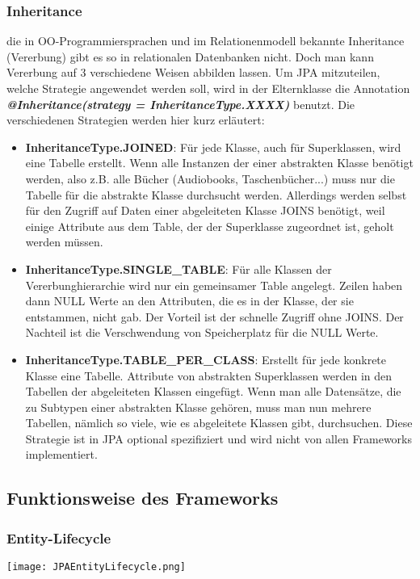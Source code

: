 \subsubsection{Inheritance}
die in OO-Programmiersprachen und im Relationenmodell bekannte Inheritance (Vererbung) gibt es so in relationalen Datenbanken nicht. Doch man kann Vererbung auf 3 verschiedene Weisen abbilden lassen. Um JPA mitzuteilen, welche Strategie angewendet werden soll, wird in der Elternklasse die Annotation \textit{\textbf{@Inheritance(strategy = InheritanceType.XXXX)}} benutzt. Die verschiedenen Strategien werden hier kurz erläutert:
\begin{itemize}
    \item \textbf{InheritanceType.JOINED}: Für jede Klasse, auch für Superklassen, wird eine Tabelle erstellt. Wenn alle Instanzen der einer abstrakten Klasse benötigt werden, also z.B. alle Bücher (Audiobooks, Taschenbücher...) muss nur die Tabelle für die abstrakte Klasse durchsucht werden. Allerdings werden selbst für den Zugriff auf Daten einer abgeleiteten Klasse JOINS benötigt, weil einige Attribute aus dem Table, der der Superklasse zugeordnet ist, geholt werden müssen.
    \item \textbf{InheritanceType.SINGLE\_TABLE}: Für alle Klassen der Vererbunghierarchie wird nur ein gemeinsamer Table angelegt. Zeilen haben dann NULL Werte an den Attributen, die es in der Klasse, der sie entstammen, nicht gab. Der Vorteil ist der schnelle Zugriff ohne JOINS. Der Nachteil ist die Verschwendung von Speicherplatz für die NULL Werte.
    \item \textbf{InheritanceType.TABLE\_PER\_CLASS}: Erstellt für jede konkrete Klasse eine Tabelle. Attribute von abstrakten Superklassen werden in den Tabellen der abgeleiteten Klassen eingefügt. Wenn man alle Datensätze, die zu Subtypen einer abstrakten Klasse gehören, muss man nun mehrere Tabellen, nämlich so viele, wie es abgeleitete Klassen gibt, durchsuchen. Diese Strategie ist in JPA optional spezifiziert und wird nicht von allen Frameworks implementiert.

\end{itemize}

\subsection{Funktionsweise des Frameworks}
\subsubsection{Entity-Lifecycle}
\vspace{5px}
\texttt{[image: JPAEntityLifecycle.png]}

